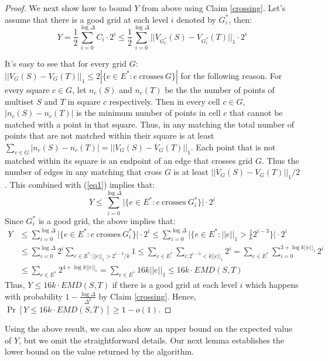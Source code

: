 \documentclass[oribibl]{llncs}
\begin{document}
\begin{proof}
We next show how to bound $Y$ from above using Claim \ref{crossing}.
Let's assume that there is a good grid at each level $i$ denoted by $G_i^*$,
then:
\begin{equation}\label{eq1}
Y = \frac{1}{2}\sum_{i=0}^{\log\Delta} C_i\cdot2^i
  \le \frac{1}{2}\sum_{i=0}^{\log\Delta}||V_{G_i^*}(S)-V_{G_i^*}(T)||_1\cdot2^i
\end{equation}

It's easy to see that for every grid $G$: 
$||V_{G}(S)-V_{G}(T)||_1 \le 2|\{e\in E^*: e~\text{crosses}~G\}|$ for the
following reason. For every square $c\in G$, let $n_c(S)$ and $n_c(T)$ be the
the number of points of multiset $S$ and $T$ in square $c$ respectively. 
Then in every cell $c\in G$, $|n_c(S)-n_c(T)|$ is the minimum number of points
in cell $c$ that cannot be matched with a point in that square. Thus, in any
matching the total number of points that are not matched within their square is
at least $\sum_{c\in G}|n_c(S)-n_c(T)| = ||V_{G}(S)-V_{G}(T)||_1$. Each
point that is not matched within its square is an endpoint of an edge that
crosses grid $G$. Thus the number of edges in any matching that cross $G$ is
at least $||V_{G}(S)-V_{G}(T)||_1/2$. This combined with (\ref{eq1}) implies 
that:
\begin{equation}\label{eq2}
Y\le \sum_{i=0}^{\log\Delta} \Big|\{e\in E^*: e~\text{crosses}~G_i^*\}\Big|\cdot2^i
\end{equation}
Since $G_i^*$ is a good grid, the above implies that:
\begin{align*}
Y &\le \sum_{i=0}^{\log\Delta} \Big|\{e\in E^*: e~\text{crosses}~G_i^*\}\Big|\cdot2^i
  \le \sum_{i=0}^{\log\Delta} \Big|\{e\in E^*: ||e||_1 > \frac{1}{k}2^{i-3}\}\Big|\cdot2^i \\
  &\le \sum_{i=0}^{\log\Delta} 2^i\sum_{e\in E^*:||e||_1 > 2^{i-3}/k}1
  \le \sum_{e\in E^*}\sum_{i:2^{i-3}<k||e||_1} 2^i
  =  \sum_{e\in E^*}\sum_{i=0}^{3 + \log k||e||_1} 2^i\\
  &\le  \sum_{e\in E^*} 2^{4 + \log k||e||_1} = \sum_{e\in E^*} 16k||e||_1
  \le 16k\cdot EMD(S,T)
\end{align*}
Thus, $Y \le 16k\cdot EMD(S,T)$
if there is a good grid at each level $i$ which
happens with probability $1-\frac{\log\Delta}{\Delta^2}$ by Claim \ref{crossing}.
Hence, $\Pr[Y \le 16k\cdot EMD(S,T)] \ge 1-o(1)$.
\end{proof}
Using the above result, we can also show an upper bound on the expected
value of $Y$, but we omit the straightforward details. Our next lemma
establishes the lower bound on the value returned by the algorithm.
\end{document}
